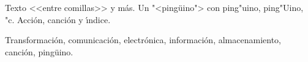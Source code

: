 \documentclass[11pt]{article}
\begin{document}
Texto <<entre comillas>> y más. Un "<pingüino"> con ping"uino, ping"Uino, "c. Acción, canción y \'{\i}ndice.
\begin{minipage}{60pt}
Transformación, comunicación, electrónica, información, almacenamiento, canción, pingüino.
\end{minipage}
\end{document}
